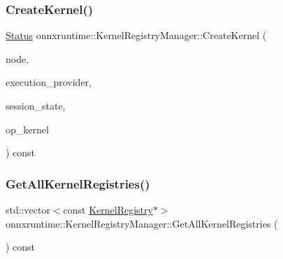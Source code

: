 \subsubsection{\texorpdfstring{Create\+Kernel()}{CreateKernel()}}
{\footnotesize\ttfamily \mbox{\hyperlink{classonnxruntime_1_1common_1_1Status}{Status}} onnxruntime\+::\+Kernel\+Registry\+Manager\+::\+Create\+Kernel (\begin{DoxyParamCaption}\item[{const \mbox{\hyperlink{classonnxruntime_1_1Node}{onnxruntime\+::\+Node}} \&}]{node,  }\item[{const \mbox{\hyperlink{classonnxruntime_1_1IExecutionProvider}{I\+Execution\+Provider}} \&}]{execution\+\_\+provider,  }\item[{const \mbox{\hyperlink{classonnxruntime_1_1SessionState}{Session\+State}} \&}]{session\+\_\+state,  }\item[{std\+::unique\+\_\+ptr$<$ \mbox{\hyperlink{classonnxruntime_1_1OpKernel}{Op\+Kernel}} $>$ \&}]{op\+\_\+kernel }\end{DoxyParamCaption}) const}

\mbox{\label{classonnxruntime_1_1KernelRegistryManager_a9f1e5dfe5920cfce9b6f2507e37c3812}} 
\subsubsection{\texorpdfstring{Get\+All\+Kernel\+Registries()}{GetAllKernelRegistries()}}
{\footnotesize\ttfamily std\+::vector$<$const \mbox{\hyperlink{classonnxruntime_1_1KernelRegistry}{Kernel\+Registry}}$\ast$$>$ onnxruntime\+::\+Kernel\+Registry\+Manager\+::\+Get\+All\+Kernel\+Registries (\begin{DoxyParamCaption}{ }\end{DoxyParamCaption}) const\hspace{0.3cm}{\ttfamily [inline]}}

\mbox{\label{classonnxruntime_1_1KernelRegistryManager_ad031e9f6951422bce513d7bab16dae7e}} 
